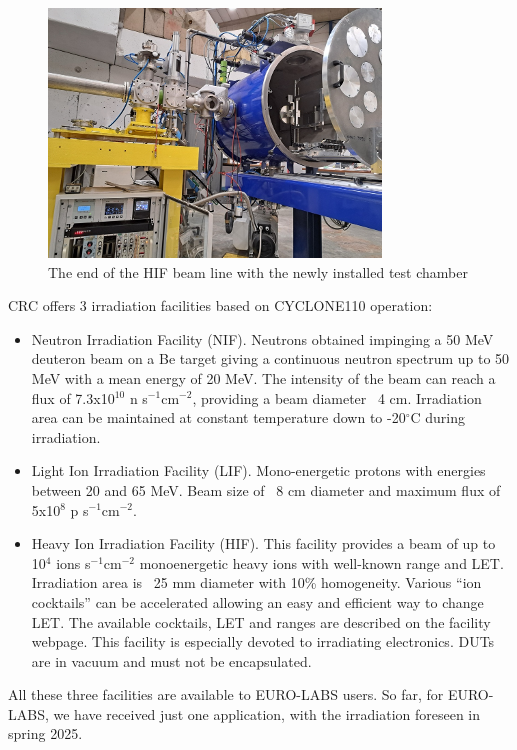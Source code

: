 \begin{figure}[!h]
    \centering
    \includegraphics[width=0.75\linewidth]{image11.png}
    \caption{The end of the HIF beam line with the newly installed test chamber }
    \label{fig:4.3.5}
\end{figure}

CRC offers 3 irradiation facilities based on CYCLONE110 operation:
\begin{itemize}
    \item Neutron Irradiation Facility (NIF). Neutrons obtained impinging a 50 MeV deuteron beam on a Be target giving a continuous neutron spectrum up to 50 MeV with a mean energy of 20 MeV. The intensity of the beam can reach a flux of 7.3x10$^{10}$ n s$^{-1}$cm$^{-2}$, providing a beam diameter ~4 cm. Irradiation area can be maintained at constant temperature down to -20$^{\circ}$C during irradiation.
    \item Light Ion Irradiation Facility (LIF). Mono-energetic protons with energies between 20 and 65 MeV. Beam size of ~8 cm diameter and maximum flux of 5x10$^{8}$ p s$^{-1}$cm$^{-2}$.
    \item Heavy Ion Irradiation Facility (HIF). This facility provides a beam of up to 10$^4$ ions s$^{-1}$cm$^{-2}$ monoenergetic heavy ions with well-known range and LET. Irradiation area is ~25 mm diameter with 10\% homogeneity. Various “ion cocktails” can be accelerated allowing an easy and efficient way to change LET. The available cocktails, LET and ranges are described on the facility webpage. This facility is especially devoted to irradiating electronics. DUTs are in vacuum and must not be encapsulated. 
\end{itemize}
All these three facilities are available to EURO-LABS users. So far, for EURO-LABS, we have received just one application, with the irradiation foreseen in spring 2025. 

